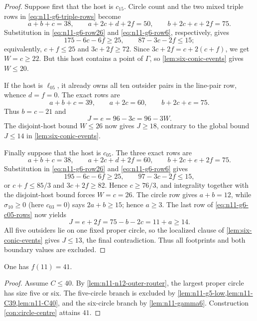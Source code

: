 \begin{proof}
Suppose first that the host is $c_{15}$.  Circle count and the two mixed
triple rows in \eqref{eq:n11-g6-triple-rows} become
\begin{equation}
 a+b+c=38,\qquad a+2c+d+2f=50,
 \qquad b+2c+e+2f=75.\label{eq:n11-g6-c15-rows}
\end{equation}
Substitution in \eqref{eq:n11-g6-row26} and
\eqref{eq:n11-g6-row6}, respectively, gives
\[
 175-6c-6f\ge25,\qquad 87-3c-2f\le15;
\]
equivalently, $c+f\le25$ and $3c+2f\ge72$.  Since
$3c+2f=c+2(c+f)$, we get $W=c\ge22$.  But this host contains a point of
$\Gamma$, so \cref{lem:six-conic-events} gives $W\le20$.

If the host is $\ell_{05}$, it already owns all ten outsider pairs in the
line-pair row, whence $d=f=0$.  The exact rows are
\[
 a+b+c=39,\qquad a+2c=60,
 \qquad b+2c+e=75.
\]
Thus $b=c-21$ and
\[
 J=e=96-3c=96-3W.
\]
The disjoint-host bound $W\le26$ now gives $J\ge18$, contrary to the global
bound $J\le14$ in \cref{lem:six-conic-events}.

Finally suppose that the host is $c_{05}$.  The three exact rows are
\begin{equation}
 a+b+c=38,\qquad a+2c+d+2f=60,
 \qquad b+2c+e+2f=75.\label{eq:n11-g6-c05-rows}
\end{equation}
Substitution in \eqref{eq:n11-g6-row26} and
\eqref{eq:n11-g6-row6} gives
\[
 195-6c-6f\ge25,\qquad 97-3c-2f\le15,
\]
or $c+f\le85/3$ and $3c+2f\ge82$.  Hence
$c\ge76/3$, and integrality together with the disjoint-host bound forces
$W=c=26$.  The circle row gives $a+b=12$, while
$\sigma_{10}\ge0$ (here $c_{03}=0$) says $2a+b\ge15$; hence $a\ge3$.
The last row of \eqref{eq:n11-g6-c05-rows} now yields
\[
 J=e+2f=75-b-2c=11+a\ge14.
\]
All five outsiders lie on one fixed proper circle, so the localized clause
of \cref{lem:six-conic-events} gives $J\le13$, the final contradiction.
Thus all footprints and both boundary values are excluded.
\end{proof}

\begin{proposition}\label{prop:n11-value}
One has $f(11)=41$.
\end{proposition}

\begin{proof}
Assume $C\le40$.  By \cref{lem:n11-n12-outer-router}, the largest proper
circle has size five or six.  The five-circle branch is excluded by
\cref{lem:n11-g5-low,lem:n11-C39,lem:n11-C40}, and the six-circle branch by
\cref{lem:n11-gamma6}.  Construction \ref{con:circle-centre} attains $41$.
\end{proof}

